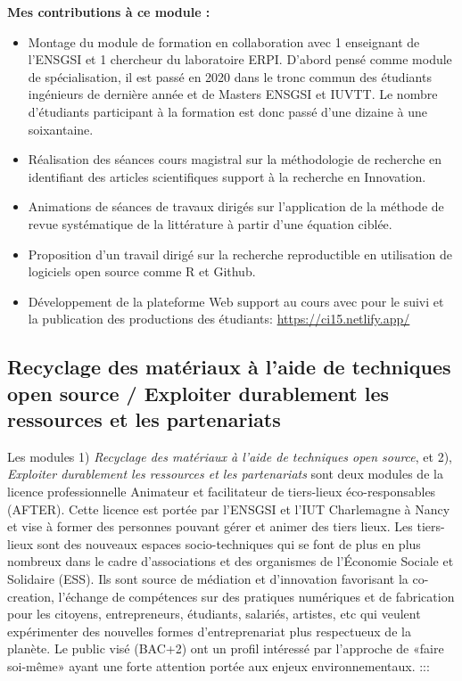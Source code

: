 \documentclass[
  11pt,
]{article}
\providecommand{\tightlist}{%
  \setlength{\itemsep}{0pt}\setlength{\parskip}{0pt}}\usepackage{longtable,booktabs,array}
\begin{document}
\textbf{Mes contributions à ce module :}

\begin{itemize}
\tightlist
\item
  Montage du module de formation en collaboration avec 1 enseignant de
  l'ENSGSI et 1 chercheur du laboratoire ERPI. D'abord pensé comme
  module de spécialisation, il est passé en 2020 dans le tronc commun
  des étudiants ingénieurs de dernière année et de Masters ENSGSI et
  IUVTT. Le nombre d'étudiants participant à la formation est donc passé
  d'une dizaine à une soixantaine.
\item
  Réalisation des séances cours magistral sur la méthodologie de
  recherche en identifiant des articles scientifiques support à la
  recherche en Innovation.
\item
  Animations de séances de travaux dirigés sur l'application de la
  méthode de revue systématique de la littérature à partir d'une
  équation ciblée.
\item
  Proposition d'un travail dirigé sur la recherche reproductible en
  utilisation de logiciels open source comme R et Github.
\item
  Développement de la plateforme Web support au cours avec pour le suivi
  et la publication des productions des étudiants:
  \url{https://ci15.netlify.app/}
\end{itemize}

\hypertarget{recyclage-des-matuxe9riaux-uxe0-laide-de-techniques-open-source-exploiter-durablement-les-ressources-et-les-partenariats}{%
\subsection{Recyclage des matériaux à l'aide de techniques open source /
Exploiter durablement les ressources et les
partenariats}\label{recyclage-des-matuxe9riaux-uxe0-laide-de-techniques-open-source-exploiter-durablement-les-ressources-et-les-partenariats}}

Les modules 1) \emph{Recyclage des matériaux à l'aide de techniques open
source}, et 2), \emph{Exploiter durablement les ressources et les
partenariats} sont deux modules de la licence professionnelle Animateur
et facilitateur de tiers-lieux éco-responsables (AFTER). Cette licence
est portée par l'ENSGSI et l'IUT Charlemagne à Nancy et vise à former
des personnes pouvant gérer et animer des tiers lieux. Les tiers-lieux
sont des nouveaux espaces socio-techniques qui se font de plus en plus
nombreux dans le cadre d'associations et des organismes de l'Économie
Sociale et Solidaire (ESS). Ils sont source de médiation et d'innovation
favorisant la co-creation, l'échange de compétences sur des pratiques
numériques et de fabrication pour les citoyens, entrepreneurs,
étudiants, salariés, artistes, etc qui veulent expérimenter des
nouvelles formes d'entreprenariat plus respectueux de la planète. Le
public visé (BAC+2) ont un profil intéressé par l'approche de «faire
soi-même» ayant une forte attention portée aux enjeux environnementaux.
:::
\end{document}
